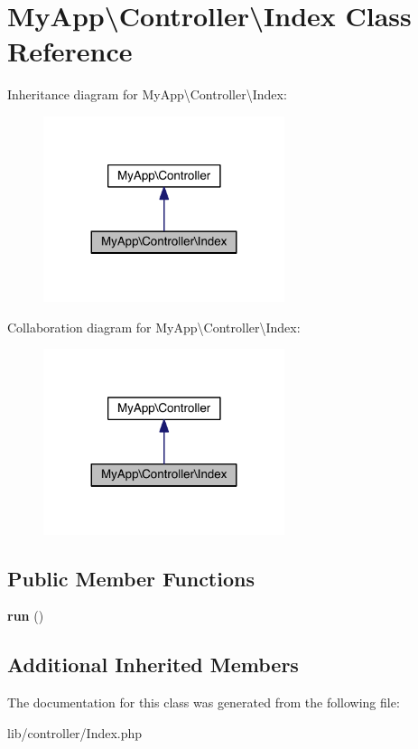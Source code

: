 \hypertarget{class_my_app_1_1_controller_1_1_index}{}\section{My\+App\textbackslash{}Controller\textbackslash{}Index Class Reference}
\label{class_my_app_1_1_controller_1_1_index}


Inheritance diagram for My\+App\textbackslash{}Controller\textbackslash{}Index\+:\nopagebreak
\begin{figure}[H]
\begin{center}
\leavevmode
\includegraphics[width=200pt]{class_my_app_1_1_controller_1_1_index__inherit__graph}
\end{center}
\end{figure}


Collaboration diagram for My\+App\textbackslash{}Controller\textbackslash{}Index\+:\nopagebreak
\begin{figure}[H]
\begin{center}
\leavevmode
\includegraphics[width=200pt]{class_my_app_1_1_controller_1_1_index__coll__graph}
\end{center}
\end{figure}
\subsection*{Public Member Functions}
\begin{DoxyCompactItemize}
\item 
{\bfseries run} ()\hypertarget{class_my_app_1_1_controller_1_1_index_aca982083dce827dd3d58199f587ef792}{}\label{class_my_app_1_1_controller_1_1_index_aca982083dce827dd3d58199f587ef792}

\end{DoxyCompactItemize}
\subsection*{Additional Inherited Members}


The documentation for this class was generated from the following file\+:\begin{DoxyCompactItemize}
\item 
lib/controller/Index.\+php\end{DoxyCompactItemize}
